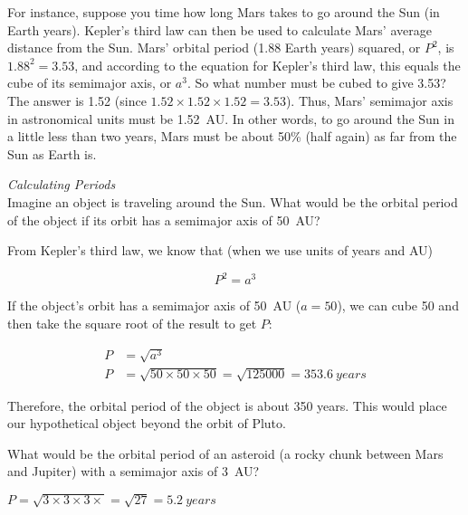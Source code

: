 \documentclass[../../main-astronomy.tex]{subfiles}
\begin{document}
\vspace{1em}

For instance, suppose you time how long Mars takes to go around the Sun (in Earth years). Kepler's third law can then be used to calculate Mars' average distance from the Sun. Mars' orbital period (1.88 Earth years) squared, or $P^2$, is  $1.88^2 = 3.53$, and according to the equation for Kepler's third law, this equals the cube of its semimajor axis, or $a^3$. So what number must be cubed to give 3.53? The answer is 1.52 (since $1.52 \times 1.52 \times 1.52 = 3.53$). Thus, Mars' semimajor axis in astronomical units must be \SI{1.52}{AU}. In other words, to go around the Sun in a little less than two years, Mars must be about 50\% (half again) as far from the Sun as Earth is.

\begin{example}
    \textit{Calculating Periods}\\
    Imagine an object is traveling around the Sun. What would be the orbital period of the object if its orbit has a semimajor axis of \SI{50}{AU}?
\end{example}

\Solution From Kepler's third law, we know that (when we use units of years and AU)

\begin{equation*}
    P^2 = a^3
\end{equation*}

If the object's orbit has a semimajor axis of \SI{50}{AU} ($a = 50$), we can cube 50 and then take the square root of the result to get $P$:

\begin{align*}
    P &= \sqrt{a^3} \\[1ex]
    P &= \sqrt{50 \times 50 \times 50} = \sqrt{\num{125000}} = \SI{353.6}{years}
\end{align*}

Therefore, the orbital period of the object is about 350 years. This would place our hypothetical object beyond the orbit of Pluto.

\endsolution

\begin{cfu}
    What would be the orbital period of an asteroid (a rocky chunk between Mars and Jupiter) with a semimajor axis of \SI{3}{AU}?
\end{cfu}

\Solution $P = \sqrt{3 \times 3 \times 3 \times} = \sqrt{27} = \SI{5.2}{years}$

\endsolution
\end{document}
